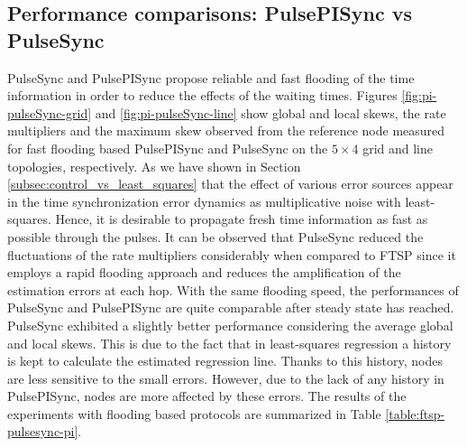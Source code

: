 \documentclass[english,a4paper,10pt,final]{article}
\numberwithin{equation}{section}
\numberwithin{figure}{section}
\begin{document}
\subsection{Performance comparisons: PulsePISync vs PulseSync}

PulseSync and PulsePISync propose reliable and fast flooding of the time information in order to reduce the effects of the waiting times. Figures \ref{fig:pi-pulseSync-grid} and \ref{fig:pi-pulseSync-line} show global and local skews, the rate multipliers and the maximum skew observed from the reference node measured for fast flooding based PulsePISync and PulseSync on the $5\times 4$ grid and line topologies, respectively. As we have shown in Section \ref{subsec:control_vs_least_squares} that the effect of various error sources appear in the time synchronization error dynamics as multiplicative noise with least-squares. Hence, it is desirable to propagate fresh time information as fast as possible through the pulses.  It can be observed that PulseSync reduced the fluctuations of the rate multipliers considerably when compared to FTSP since it employs a rapid flooding approach and reduces the amplification of the estimation errors at each hop.  With the same flooding speed, the performances of PulseSync and PulsePISync are quite comparable after steady state has reached. PulseSync exhibited a slightly better performance considering the average global and local skews. This is due to the fact that in least-squares regression a history is kept to calculate the estimated regression line. Thanks to this history, nodes are less sensitive to the small errors. However, due to the lack of any history in PulsePISync, nodes are more affected by these errors. The results of the experiments with flooding based protocols are summarized in Table \ref{table:ftsp-pulsesync-pi}.
\end{document}
